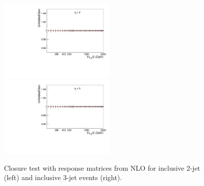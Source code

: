 \begin{figure}[!htp]
  \begin{center}
    \includegraphics[width=0.5\textwidth]{Plots_HT_2_150/Ratio_Unfolding_NLO_2.pdf}%
    \includegraphics[width=0.5\textwidth]{Plots_HT_2_150/Ratio_Unfolding_NLO_3.pdf}
    \caption{Closure test with response matrices from NLO for inclusive 2-jet (left) and inclusive 3-jet events (right).}
    \label{fig:unfolded_smeared}
 

\end{center}
\end{figure}
